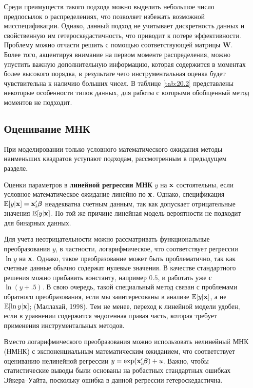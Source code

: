 Среди преимуществ такого подхода можно выделить небольшое число предпосылок о распределениях, что позволяет избежать возможной мисспецификации. Однако, данный подход не учитывает дискретность данных и свойственную им гетероскедастичность, что приводит к потере эффективности. Проблему можно отчасти решить с помощью соответствующей матрицы $\mathbf{W}$. Более того, акцентируя внимание на первом моменте распределения, можно упустить важную дополнительную информацию, которая содержится в моментах более высокого порядка, в результате чего инструментальная оценка будет чувствительна к наличию больших чисел. В таблице \ref{tab:20.2} представлены некоторые особенности типов данных, для работы с которыми обобщенный метод моментов не подходит.


\subsection{Оценивание МНК}\label{sec:20.5.2}

\noindent
При моделировании только условного математического ожидания методы наименьших квадратов уступают подходам, рассмотренным в предыдущем разделе.

Оценки параметров в \textbf{линейной регрессии МНК} $y$ на $\mathbf{x}$ состоятельны, если условное математическое ожидание линейно по $\mathbf{x}$. Однако, спецификация $\mathbb{E}[y|\mathbf{x}] = \mathbf{x}_i'\bm{\beta}$ неадекватна счетным данным, так как допускает отрицательные значения $\mathbb{E}[y|\mathbf{x}]$. По той же причине линейная модель вероятности не подходит для бинарных данных.

Для учета неотрицательности можно рассматривать функциональные преобразования $y$, в частности, логарифмическое, что соответствует регрессии $\ln y$ на $\mathbf{x}$. Однако, такое преобразование может быть проблематично, так как счетные данные обычно содержат нулевые значения. В качестве стандартного решения можно прибавить константу, например $0.5$, и работать уже с $\ln (y + .5)$. В свою очередь, такой специальный метод связан с проблемами обратного преобразования, если мы заинтересованы в анализе $\mathbb{E}[y|\mathbf{x}]$, а не $\mathbb{E}[\ln y|\mathbf{x}]$; (Маллахай, 1998).
Тем не менее, переход к линейной модели удобен, если в уравнении содержится эндогенная правая часть, которая требует применения инструментальных методов.

Вместо логарифмического преобразования можно использовать нелинейный МНК (НМНК) с экспоненциальным математическим ожиданием, что соответствует оцениванию нелинейной регрессии $y = \exp(\mathbf{x}_i'\bm{\beta}) + u$. Важно, чтобы статистические выводы были основаны на робастных стандартных ошибках Эйкера--Уайта, поскольку ошибка в данной регрессии гетероскедастична.

